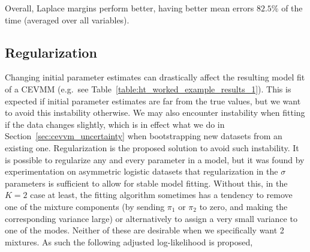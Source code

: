 \documentclass[11pt,twoside,openany]{book}
\numberwithin{Theorem}{chapter}
\numberwithin{Definition}{chapter}
\numberwithin{Lemma}{chapter}
\numberwithin{Algorithm}{chapter}
\numberwithin{equation}{chapter}
\begin{document}
Overall, Laplace margins perform better, having better mean errors $82.5\%$ of the time
(averaged over all variables).






\subsection{Regularization}\label{sec:regularization}

Changing initial parameter estimates can drastically affect the resulting model
fit of a CEVMM (e.g.\ see Table~\ref{table:ht_worked_example_results_1}).
This is expected if initial parameter estimates are far from the true values,
but we want to avoid this instability otherwise. We may also
encounter instability when fitting if the data changes slightly, which is
in effect what we do in Section~\ref{sec:cevvm_uncertainty} when bootstrapping
new datasets from an existing one. Regularization is the proposed solution
to avoid such instability.
It is possible to regularize any and every parameter in a model, but it was
found by experimentation on asymmetric logistic datasets that regularization in
the $\sigma$ parameters is sufficient to allow for stable model fitting.
Without this, in the $K=2$ case at least, the fitting
algorithm sometimes has a tendency to remove one of the mixture components (by sending
$\pi_1$ or $\pi_2$ to zero, and making the corresponding variance large) or
alternatively to assign a very small variance to one of the modes. Neither of
these are desirable when we specifically want 2 mixtures. As such the following
adjusted log-likelihood is proposed,
\end{document}
